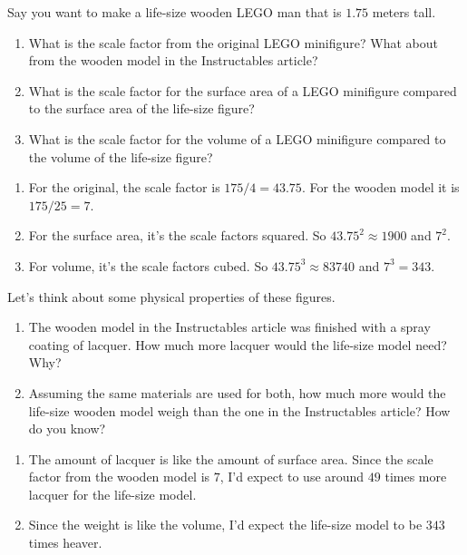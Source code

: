 \documentclass[handout,nooutcomes,noauthor,hints]{ximera}
\begin{document}
\begin{question}
 Say you want to make a life-size wooden LEGO man that is $1.75$
 meters tall.
 
\begin{enumerate}
 \item What is the scale factor from the original LEGO minifigure?
   What about from the wooden model in the Instructables article?
 \item What is the scale factor for the surface area of a LEGO
   minifigure compared to the surface area of the life-size figure?
 \item What is the scale factor for the volume of a LEGO
   minifigure compared to the volume of the life-size figure?
\end{enumerate}
\begin{freeResponse}
  \begin{enumerate}
\item For the original, the scale factor is $175/4 = 43.75$. For the wooden model it is $175/25 = 7$.
\item For the surface area, it's the scale factors squared. So $43.75^2\approx 1900$ and $7^2$.
\item For volume, it's the scale factors cubed. So $43.75^3\approx 83740$ and $7^3 = 343$.
  \end{enumerate}
\end{freeResponse}
\end{question}
\mynewpage

\begin{question}
  Let's think about some physical properties of these figures.
  \begin{enumerate}
 \item The wooden model in the Instructables article was finished with
   a spray coating of lacquer.  How much more lacquer would the life-size model need? Why?
 \item Assuming the same materials are used for both, how much more
   would the life-size wooden model weigh than the one in the
   Instructables article?  How do you know?
\end{enumerate}
  \begin{freeResponse}
    \begin{enumerate}
  \item The amount of lacquer is like the amount of surface
    area. Since the scale factor from the wooden model is $7$, I'd
    expect to use around $49$ times more lacquer for the life-size
    model.
  \item Since the weight is like the volume, I'd expect the life-size model to be $343$ times heaver.
    \end{enumerate}
    \end{freeResponse}
\end{question}
\end{document}
